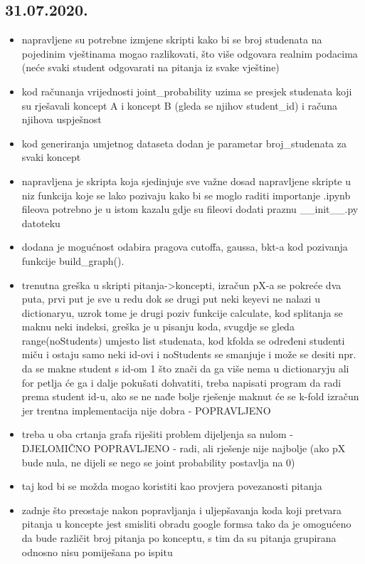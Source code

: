 		\subsection{31.07.2020.}
		\begin{itemize}
			\item napravljene su potrebne izmjene skripti kako bi se broj studenata na pojedinim vještinama mogao razlikovati, što više odgovara realnim podacima (neće svaki student odgovarati na pitanja iz svake vještine)
			\item kod računanja vrijednosti joint\_probability uzima se presjek studenata koji su rješavali koncept A i koncept B (gleda se njihov student\_id) i računa njihova uspješnost
			\item kod generiranja umjetnog dataseta dodan je parametar broj\_studenata za svaki koncept
			\item napravljena je skripta koja sjedinjuje sve važne dosad napravljene skripte u niz funkcija koje se lako pozivaju
			kako bi se moglo raditi importanje .ipynb fileova potrebno je u istom kazalu gdje su  fileovi dodati praznu \_\_init\_\_.py datoteku
			\item 	dodana je mogućnost odabira pragova cutoffa, gaussa, bkt-a kod pozivanja funkcije build\_graph().
			\item 	trenutna greška u skripti pitanja->koncepti, izračun pX-a se pokreće dva puta, prvi put je sve u redu dok se drugi put neki keyevi ne nalazi u dictionaryu, uzrok tome je drugi poziv funkcije calculate, kod splitanja se maknu neki indeksi, greška je u pisanju koda, svugdje se gleda range(noStudents) umjesto list studenata, kod kfolda se određeni studenti miču i ostaju samo neki id-ovi i noStudents se smanjuje i može se desiti npr. da se makne student s id-om 1 što znači da ga više nema u dictionaryju ali for petlja će ga i dalje pokušati dohvatiti, treba napisati program da radi prema student id-u, ako se ne nađe bolje rješenje maknut će se k-fold izračun jer trentna implementacija nije dobra - POPRAVLJENO
			\item 
			treba u oba crtanja grafa riješiti problem dijeljenja sa nulom - DJELOMIČNO POPRAVLJENO - radi, ali rješenje nije najbolje (ako pX bude nula, ne dijeli se nego se joint probability postavlja na 0)
			\item taj kod bi se možda mogao koristiti kao provjera povezanosti pitanja
			\item zadnje što preostaje nakon popravljanja i uljepšavanja koda koji pretvara pitanja u koncepte jest smisliti obradu google formsa tako da je omogućeno da bude različit broj pitanja po konceptu, s tim da su pitanja grupirana odnosno nisu pomiješana po ispitu
		\end{itemize}	
